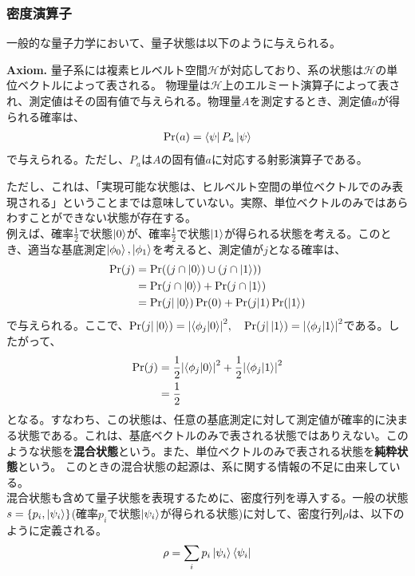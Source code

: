 \documentclass[a4paper,11pt]{jsarticle}
\numberwithin{equation}{section}
\begin{document}
\subsubsection{密度演算子}
一般的な量子力学において、量子状態は以下のように与えられる。
\begin{itembox}[l]{\textbf{Axiom.}}
    量子系には複素ヒルベルト空間$\mathcal{H}$が対応しており、系の状態は$\mathcal{H}$の単位ベクトルによって表される。
    物理量は$\mathcal{H}$上のエルミート演算子によって表され、測定値はその固有値で与えられる。物理量$A$を測定するとき、測定値$a$が得られる確率は、
    \begin{align}
        \Pr(a) = \bra{\psi}P_a\ket{\psi}
    \end{align}
    で与えられる。ただし、$P_a$は$A$の固有値$a$に対応する射影演算子である。
\end{itembox}
ただし、これは、「実現可能な状態は、ヒルベルト空間の単位ベクトルでのみ表現される」ということまでは意味していない。実際、単位ベクトルのみではあらわすことができない状態が存在する。\\
例えば、確率$\frac{1}{2}$で状態$\ket{0}$が、確率$\frac{1}{2}$で状態$\ket{1}$が得られる状態を考える。このとき、適当な基底測定$\ket{\phi_0}, \ket{\phi_1}$を考えると、測定値が$j$となる確率は、
\begin{align}
    \Pr(j) &= \Pr((j \cap \ket{0}) \cup (j \cap \ket{1}))\\
    &= \Pr(j \cap \ket{0}) + \Pr(j \cap \ket{1})\\
    &= \Pr(j|\ket{0})\Pr(0) + \Pr(j|1)\Pr(\ket{1})
\end{align}
で与えられる。ここで、$\Pr(j|\ket{0}) = \abs{\braket{\phi_j}{0}}^2,\quad \Pr(j|\ket{1}) = \abs{\braket{\phi_j}{1}}^2$である。したがって、
\begin{align}
    \Pr(j) &= \frac{1}{2}\abs{\braket{\phi_j}{0}}^2 + \frac{1}{2}\abs{\braket{\phi_j}{1}}^2\\
    &= \frac{1}{2}
\end{align}
となる。すなわち、この状態は、任意の基底測定に対して測定値が確率的に決まる状態である。これは、基底ベクトルのみで表される状態ではありえない。このような状態を\textbf{混合状態}という。また、単位ベクトルのみで表される状態を\textbf{純粋状態}という。
このときの混合状態の起源は、系に関する情報の不足に由来している。\\
混合状態も含めて量子状態を表現するために、密度行列を導入する。一般の状態$s= \{ p_i, \ket{\psi_i} \}$(確率$p_i$で状態$\ket{\psi_i}$が得られる状態)に対して、密度行列$\rho$は、以下のように定義される。
\begin{align}
    \rho = \sum_i p_i\ket{\psi_i}\bra{\psi_i}
\end{align}
\end{document}
